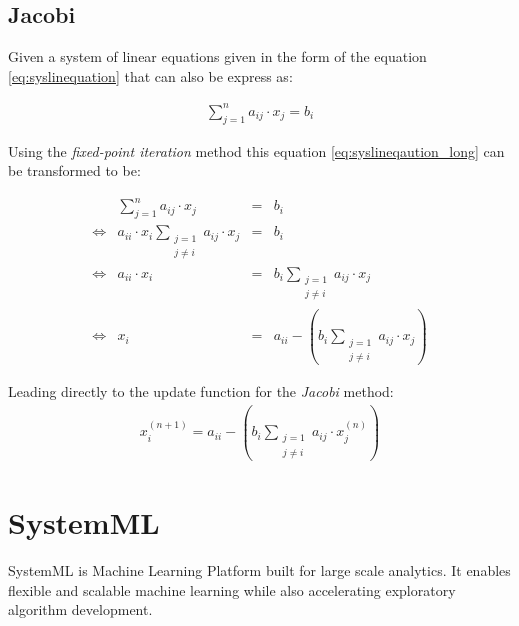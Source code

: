 \subsection{Jacobi} \label{jacobi}
Given a system of linear equations given in the form of the equation \eqref{eq:syslinequation} that can also be express as:

\begin{equation}\label{eq:syslineqaution_long}
	\begin{array}{lcl}
		\displaystyle\sum_{j=1}^{n} a_{ij} \cdot x_j = b_i
	\end{array}
\end{equation}

Using the \textit{fixed-point iteration} method this equation \eqref{eq:syslineqaution_long} can be transformed to be:

\begin{equation}\label{eq:syslineqaution_fixedpoint}
	\begin{array}{lrcl}
		&\displaystyle\sum_{j=1}^{n} a_{ij} \cdot x_j &=& b_i\\
        \Leftrightarrow & a_{ii} \cdot x_i \displaystyle\sum_{\substack{j=1 \\ j\neq i}} a_{ij} \cdot x_j &=& b_i\\
        \Leftrightarrow & a_{ii} \cdot x_i  &=& b_i \displaystyle\sum_{\substack{j=1 \\ j\neq i}} a_{ij} \cdot x_j\\
        \Leftrightarrow & x_i  &=& a_{ii} - (b_i \displaystyle\sum_{\substack{j=1 \\ j\neq i}} a_{ij} \cdot x_j)
	\end{array}
\end{equation}

Leading directly to the update function for the \textit{Jacobi} method:
\begin{equation}\label{eq:jacobi_update}
	\begin{array}{lrcl}
		x_i^{(n+1)}  = a_{ii} - (b_i \displaystyle\sum_{\substack{j=1 \\ j\neq i}} a_{ij} \cdot x_j^{(n)})
	\end{array}
\end{equation}



\section{SystemML}
SystemML is Machine Learning Platform built for large scale analytics. It enables flexible and scalable machine learning while also accelerating exploratory algorithm development. 

